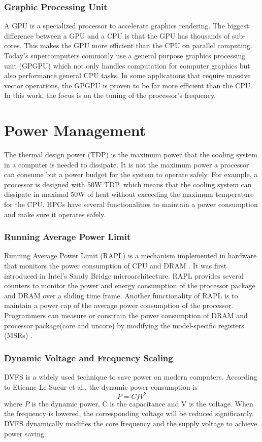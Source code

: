 \subsubsection{Graphic Processing Unit}
A GPU is a specialized processor to accelerate graphics rendering. The biggest difference between a GPU and a CPU is that the GPU has thousands of sub-cores. This makes the GPU more efficient than the CPU on parallel computing. Today's supercomputers commonly use a general purpose graphics processing unit (GPGPU) which not only handles computation for computer graphics but also performance general CPU tasks. In some applications that require massive vector operations, the GPGPU is proven to be far more efficient than the CPU. In this work, the focus is on the tuning of the processor's frequency.

\section{Power Management}
The thermal design power (TDP) is the maximum power that the cooling system in a computer is needed to dissipate. It is not the maximum power a processor can consume but a power budget for the system to operate safely. For example, a processor is designed with 50W TDP, which means that the cooling system can dissipate in maximal 50W of heat without exceeding the maximum temperature for the CPU. HPCs have several functionalities to maintain a power consumption and make sure it operates safely.
\subsubsection{Running Average Power Limit}
Running Average Power Limit (RAPL) is a mechanism implemented in hardware that monitors the power consumption of CPU and DRAM \cite{19}. It was first introduced in Intel's Sandy Bridge microarchitecture. RAPL provides several counters to monitor the power and energy consumption of the processor package and DRAM over a sliding time frame. Another functionality of RAPL is to maintain a power cap of the average power consumption of the processor. Programmers can measure or constrain the power consumption of DRAM and processor package(core and uncore) by modifying the model-specific registers (MSRs) \cite{21}.
\subsubsection{Dynamic Voltage and Frequency Scaling}
DVFS \cite{22} is a widely used technique to save power on modern computers. According to Etienne Le Sueur et al., the dynamic power consumption is 
\begin{equation}
P = CfV^2
\end{equation}
where $P$ is the dynamic power, C is the capacitance and V is the voltage. When the frequency is lowered, the corresponding voltage will be reduced significantly. DVFS dynamically modifies the core frequency and the supply voltage to achieve power saving.

